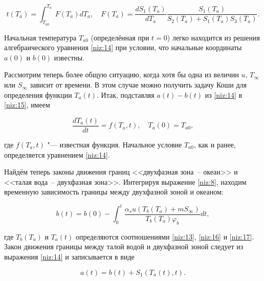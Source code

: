 \begin{equation}

t(T_a)=\int^{T_a}_{T_{a0}}F(T_a)dT_a, \quad F(T_a)=\frac{dS_1(T_a)}{dT_a}\frac{S_1(T_a)}{S_2(T_a)+S_1(T_a)S_3(T_a)}. 

\label{niz:16}

\end{equation}

Начальная температура $T_{a0}$ (определённая при $t=0$) легко находится из решения алгебраического уравнения \eqref{niz:14} при условии, что начальные координаты $a(0)$ и $b(0)$ известны.



Рассмотрим теперь более общую ситуацию, когда хотя бы одна из величин $u$, $T_\infty$ или $S_\infty$ зависит от времени. В этом случае можно получить задачу Коши для определения функции $T_a(t)$. Итак, подставляя $a(t)-b(t)$ из \eqref{niz:14} в \eqref{niz:15}, имеем

\begin{equation}

\frac{dT_a(t)}{dt}=f(T_a,t), \quad T_a(0)=T_{a0} ,

\label{niz:17}

\end{equation}

где $f(T_a,t)$ "--- известная функция. Начальное условие $T_{a0}$, как и ранее, определяется уравнением \eqref{niz:14}.



Найдём теперь законы движения границ <<двухфазная зона~-- океан>> и <<талая вода~-- двухфазная зона>>. Интегрируя выражение \eqref{niz:8}, находим временную зависимость границы между двухфазной зоной и океаном:

\begin{equation}

b(t)=b(0)-\int_0^t\frac{\alpha_s u(T_b(T_a)+mS_\infty)}{T_b(T_a)\varphi_b}dt,

\label{niz:18}

\end{equation}

где $T_b(T_a)$ и $T_a(t)$ определяются соотношениями \eqref{niz:13}, \eqref{niz:16} и \eqref{niz:17}. Закон движения границы между талой водой и двухфазной зоной следует из выражения \eqref{niz:14} и записывается в виде

\begin{equation}

a(t)=b(t)+S_1(T_a(t),t).

\label{niz:19}

\end{equation}



